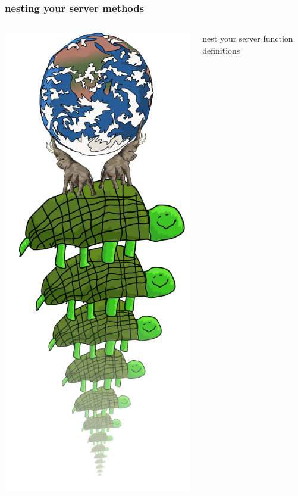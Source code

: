 \documentclass{beamer}
\begin{document}
\begin{frame}
    \frametitle{nesting your server methods}
    \begin{columns}[c]
        \includegraphics[scale=0.28]{images/all_the_way_down.png}
        \begin{center}
        \fbox{}
        \newline
        
        \huge
        nest your server function definitions
        
        \end{center}
    \end{columns}
\end{frame}
\end{document}
